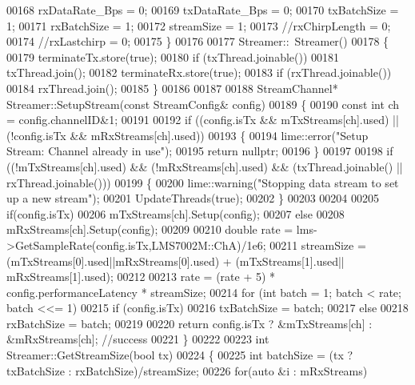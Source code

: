\begin{DoxyCode}
00168     rxDataRate_Bps = 0;
00169     txDataRate_Bps = 0;
00170     txBatchSize = 1;
00171     rxBatchSize = 1;
00172     streamSize = 1;
00173     \textcolor{comment}{//rxChirpLength = 0;}
00174     \textcolor{comment}{//rxLastchirp = 0;}
00175 \}
00176 
00177 Streamer::~Streamer()
00178 \{
00179     terminateTx.store(\textcolor{keyword}{true});
00180     \textcolor{keywordflow}{if} (txThread.joinable())
00181         txThread.join();
00182     terminateRx.store(\textcolor{keyword}{true});
00183     \textcolor{keywordflow}{if} (rxThread.joinable())
00184         rxThread.join();
00185 \}
00186 
00187 
00188 StreamChannel* Streamer::SetupStream(\textcolor{keyword}{const} StreamConfig& config)
00189 \{
00190     \textcolor{keyword}{const} \textcolor{keywordtype}{int} ch = config.channelID&1;
00191 
00192     \textcolor{keywordflow}{if} ((config.isTx && mTxStreams[ch].used) || (!config.isTx && mRxStreams[ch].used))
00193     \{
00194         lime::error(\textcolor{stringliteral}{"Setup Stream: Channel already in use"});
00195         \textcolor{keywordflow}{return} \textcolor{keyword}{nullptr};
00196     \}
00197 
00198     \textcolor{keywordflow}{if} ((!mTxStreams[ch].used) && (!mRxStreams[ch].used) && (txThread.joinable() || 
      rxThread.joinable()))
00199     \{
00200         lime::warning(\textcolor{stringliteral}{"Stopping data stream to set up a new stream"});
00201         UpdateThreads(\textcolor{keyword}{true});
00202     \}
00203 
00204 
00205     \textcolor{keywordflow}{if}(config.isTx)
00206         mTxStreams[ch].Setup(config);
00207     \textcolor{keywordflow}{else}
00208         mRxStreams[ch].Setup(config);
00209 
00210     \textcolor{keywordtype}{double} rate = lms->GetSampleRate(config.isTx,LMS7002M::ChA)/1e6;
00211     streamSize = (mTxStreams[0].used||mRxStreams[0].used) + (mTxStreams[1].used||
      mRxStreams[1].used);
00212 
00213     rate = (rate + 5) * config.performanceLatency * streamSize;
00214     for (\textcolor{keywordtype}{int} batch = 1; batch < rate; batch <<= 1)
00215         \textcolor{keywordflow}{if} (config.isTx)
00216             txBatchSize = batch;
00217         \textcolor{keywordflow}{else}
00218             rxBatchSize = batch;
00219 
00220     \textcolor{keywordflow}{return} config.isTx ? &mTxStreams[ch] : &mRxStreams[ch]; \textcolor{comment}{//success}
00221 \}
00222 
00223 \textcolor{keywordtype}{int} Streamer::GetStreamSize(\textcolor{keywordtype}{bool} tx)
00224 \{
00225     \textcolor{keywordtype}{int} batchSize = (tx ? txBatchSize : rxBatchSize)/streamSize;
00226     \textcolor{keywordflow}{for}(\textcolor{keyword}{auto} &i : mRxStreams)

\end{DoxyCode}
